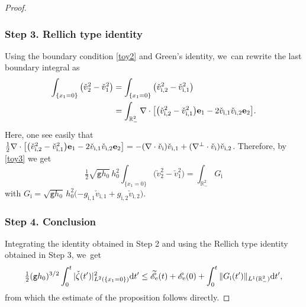 \documentclass[JEP,XML,SOM,Unicode,NoFloatCountersInSection,published]{cedram}
\newcommand{\gr}{{\mathtt g}}
\newcommand{\R}{{\mathbb R}}
\theoremstyle{definition}
\begin{document}
\begin{proof}
\subsubsection*{Step 3. Rellich type identity}
Using the boundary condition \eqref{toy2} and Green's identity, we~can rewrite the last boundary integral as
\begin{align*}
\int_{\{x_1=0\}}\big(\check{v}_2^2- \check{v}_1^2\big)
&= \int_{\{x_1=0\}}\big(\check{v}_\mathrm{i,2}^2- \check{v}_\mathrm{i,1}^2\big)\\
&= \int_{\R^2_-}\nabla\cdot \big[\big(\check{v}_\mathrm{i,2}^2- \check{v}_\mathrm{i,1}^2\big) {\bf e}_1- 2 \check{v}_\mathrm{i,1}\check{v}_\mathrm{i,2}{\bf e}_2\big].
\end{align*}
Here, one see easily that
$\frac{1}{2}\nabla\cdot \big[\big(\check{v}_\mathrm{i,2}^2-\check{v}_\mathrm{i,1}^2\big) {\bf e}_1- 2 \check{v}_\mathrm{i,1}\check{v}_\mathrm{i,2}{\bf e}_2\big]
=-(\nabla\cdot \check{v}_\mathrm{i})\check{v}_\mathrm{i,1}+(\nabla^\perp \cdot \check{v}_\mathrm{i})\check{v}_\mathrm{i,2}$.
Therefore, by \eqref{toy3} we get
\[
\tfrac{1}{2}\sqrt{\gr h_0}\,h_0^2 \int_{\{x_1=0\}} \big(\check{v}_2^2-\check{v}_1^2\big)=\int_{\R^2_-}G_\mathrm{i}
\]
with $G_\mathrm{i}=\sqrt{\gr h_0}\,h_0^2 (-g_\mathrm{i,1}\check{v}_\mathrm{i,1}+g_\mathrm{i,2}\check{v}_\mathrm{i,2}\big)$.

\subsubsection*{Step 4. Conclusion}
Integrating the identity obtained in Step 2 and using the Rellich type identity obtained in Step 3, we~get
\[
\tfrac{1}{2}(\gr h_0)^{3/2}\int_0^t \vert \check{\zeta}(t')\vert^2_{L^2(\{x_1=0\})}{\rm d}t'
\leq \widetilde{\mathscr E}_\mathrm{e}(t) + {\mathscr E}_\mathrm{e}(0)+\int_0^t \Vert G_\mathrm{i}(t')\Vert_{L^1(\R^2_-)}{\rm d}t',
\]
from which the estimate of the proposition follows directly.
\end{proof}
\end{document}
